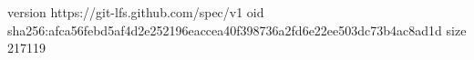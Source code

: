 version https://git-lfs.github.com/spec/v1
oid sha256:afca56febd5af4d2e252196eaccea40f398736a2fd6e22ee503dc73b4ac8ad1d
size 217119
